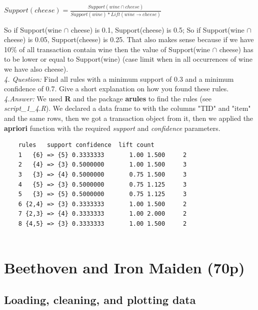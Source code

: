 \documentclass[a4paper]{article}
\begin{document}
	\begin{center}
		$Support(cheese) = \frac{Support(wine\cap cheese)}{Support(wine) * Lift(wine \rightarrow cheese)}$
	\end{center}
	So if Support(wine $\cap$ cheese) is 0.1, Support(cheese) is 0.5; So if Support(wine $\cap$ cheese) is 0.05, Support(cheese) is 0.25. That also makes sense because if we have 10\% of all transaction contain wine then the value of Support(wine $\cap$ cheese) has to be lower or equal to Support(wine) (case limit when in all occurrences of wine we have also cheese).\\
	\newline
	\textit{4. Question:} Find all rules with a minimum support of 0.3 and a minimum confidence of 0.7. Give a
	short explanation on how you found these rules.\\
	\textit{4.Answer:} We used \textbf{R} and the package \textbf{arules} to find the rules (see \textit{script\_1\_4.R}). We declared a data frame to with the columns "TID" and "item" and the same rows, then we got a transaction object from it, then we applied the \textbf{apriori} function with the required \textit{support} and \textit{confidence} parameters.
	
	\begin{lstlisting}
	rules   support confidence  lift count
	1   {6} => {5} 0.3333333       1.00 1.500     2
	2   {4} => {3} 0.5000000       1.00 1.500     3
	3   {3} => {4} 0.5000000       0.75 1.500     3
	4   {5} => {3} 0.5000000       0.75 1.125     3
	5   {3} => {5} 0.5000000       0.75 1.125     3
	6 {2,4} => {3} 0.3333333       1.00 1.500     2
	7 {2,3} => {4} 0.3333333       1.00 2.000     2
	8 {4,5} => {3} 0.3333333       1.00 1.500     2
	
	\end{lstlisting}
	
	
	\section{Beethoven and Iron Maiden (70p)}
	\subsection{Loading, cleaning, and plotting data}
	\label{sec:21}
	
\end{document}
